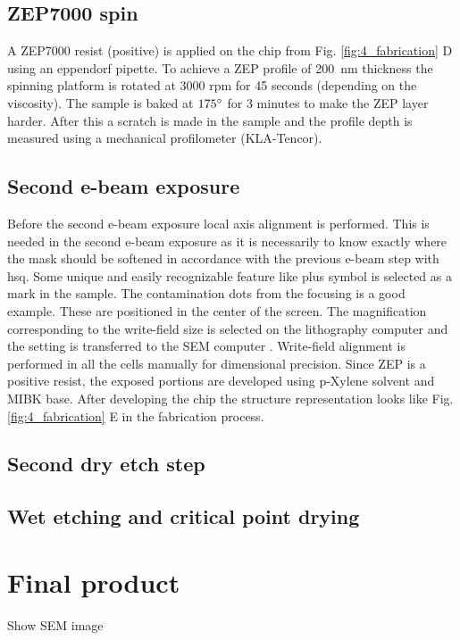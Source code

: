 \documentclass[../report.tex]{subfiles}
\begin{document}
\subsection{ZEP7000 spin}
A ZEP7000 resist (positive) is applied on the chip from Fig. \ref{fig:4_fabrication} D using an eppendorf pipette. To achieve a ZEP profile of \SI{200}{\nano \meter} thickness the spinning platform is rotated at 3000 rpm for 45 seconds (depending on the viscosity). The sample is baked at $\mathrm{175^{\circ}}$ for 3 minutes to make the ZEP layer harder. After this a scratch is made in the sample and the profile depth is measured using a mechanical profilometer (KLA-Tencor).

\subsection{Second e-beam exposure}
Before the second e-beam exposure local axis alignment is performed. This is needed in the second e-beam exposure as it is necessarily to know exactly where the mask should be softened in accordance with the previous e-beam step with \gls{hsq}. Some unique and easily recognizable feature like plus symbol is selected as a mark in the sample. The contamination dots from the focusing is a good example. These are positioned in the center of the screen. The magnification corresponding to the write-field size is selected on the lithography computer and the setting is transferred to the SEM computer \cite{write_field}. Write-field alignment is performed in all the cells manually for dimensional precision. Since ZEP is a positive resist, the exposed portions are developed using p-Xylene solvent and MIBK base. After developing the chip the structure representation looks like Fig. \ref{fig:4_fabrication} E in the fabrication process.

\subsection{Second dry etch step}

\subsection{Wet etching and critical point drying}



\section{Final product}

Show SEM image
\end{document}
